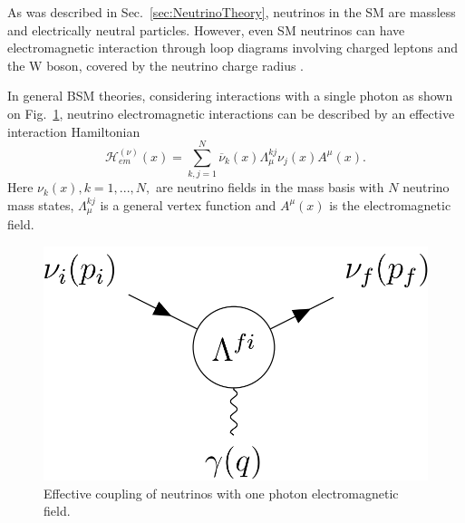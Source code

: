 As was described in Sec.~\ref{sec:NeutrinoTheory}, neutrinos in the \gls{SM} are massless and electrically neutral particles. However, even \gls{SM} neutrinos can have electromagnetic interaction through loop diagrams involving charged leptons and the W boson, covered by the neutrino charge radius \cite{SnowmassNeutrinoFrontierReport.pdf}.


In general \gls{BSM} theories, considering interactions with a single photon as shown on Fig.~\ref{fig:FeynmanNuElmagDiagram}, neutrino electromagnetic interactions can be described by an effective interaction Hamiltonian \cite{nuElmagInt2015.pdf}
\begin{equation}
\mathcal{H}^{\left(\nu\right)}_{em}\left(x\right)=\sum^N_{k,j=1}\overline{\nu}_k\left(x\right)\Lambda^{kj}_{\mu}\nu_j\left(x\right)A^{\mu}\left(x\right).
\end{equation}
Here $\nu_k\left(x\right), k = 1,...,N,$ are neutrino fields in the mass basis with $N$ neutrino mass states, $\Lambda^{kj}_{\mu}$ is a general vertex function and $A^{\mu}\left(x\right)$ is the electromagnetic field.

\begin{figure}[hbtp]
\centering
\includegraphics[width=0.4\linewidth]{Plots/NuMM/FeynmanDiagramNuElmagInt.png}
\caption{Effective coupling of neutrinos with one photon electromagnetic field.}
\label{fig:FeynmanNuElmagDiagram}
\end{figure}

